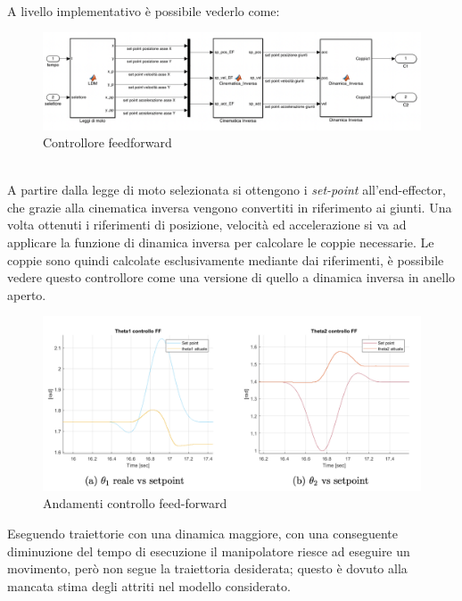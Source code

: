 \\A livello implementativo è possibile vederlo come:
\begin{figure}[ht]
	\begin{center}
		\includegraphics[scale=0.35]{Immagini/Controllori/feedForward}
		\caption{Controllore feedforward}
		\label{fig:FF}
	\end{center}
\end{figure}
\\A partire dalla legge di moto selezionata si ottengono i \textit{set-point} all'end-effector, che grazie alla cinematica inversa vengono convertiti in riferimento ai giunti.  Una volta ottenuti i riferimenti di posizione, velocità ed accelerazione si va ad applicare la funzione di dinamica inversa per calcolare le coppie necessarie. Le coppie sono quindi calcolate esclusivamente mediante dai riferimenti, è possibile vedere questo controllore come una versione di quello a dinamica inversa in anello aperto.
\begin{figure}[ht]
	\begin{center}
		\includegraphics[scale=0.45]{Immagini/Traiettorie/fftot}
\caption{Andamenti controllo feed-forward}
		\label{fig:ffcoppie}
	\end{center}
\end{figure}
Eseguendo traiettorie con una dinamica maggiore, con una conseguente diminuzione del tempo di esecuzione il manipolatore riesce ad eseguire un movimento, però non segue la traiettoria desiderata; questo è dovuto alla mancata stima degli attriti nel modello considerato.
